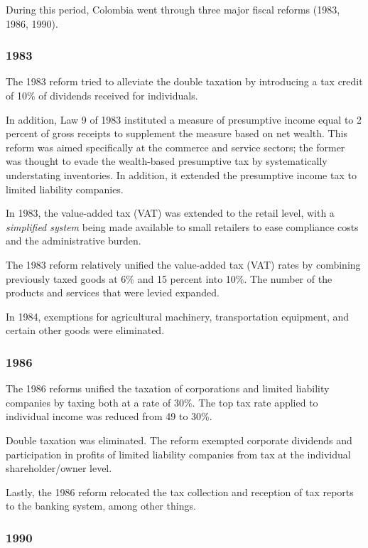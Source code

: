 \documentclass[
  12pt]{article}
\theoremstyle{definition}
\theoremstyle{remark}
\begin{document}
During this period, Colombia went through three major fiscal reforms
(1983, 1986, 1990).

\subsubsection{1983}\label{section}

The 1983 reform tried to alleviate the double taxation by introducing a
tax credit of 10\% of dividends received for individuals.

In addition, Law 9 of 1983 instituted a measure of presumptive income
equal to 2 percent of gross receipts to supplement the measure based on
net wealth. This reform was aimed specifically at the commerce and
service sectors; the former was thought to evade the wealth-based
presumptive tax by systematically understating inventories. In addition,
it extended the presumptive income tax to limited liability companies.

In 1983, the value-added tax (VAT) was extended to the retail level,
with a \emph{simplified system} being made available to small retailers
to ease compliance costs and the administrative burden.

The 1983 reform relatively unified the value-added tax (VAT) rates by
combining previously taxed goods at 6\% and 15 percent into 10\%. The
number of the products and services that were levied expanded.

In 1984, exemptions for agricultural machinery, transportation
equipment, and certain other goods were eliminated.

\subsubsection{1986}\label{section-1}

The 1986 reforms unified the taxation of corporations and limited
liability companies by taxing both at a rate of 30\%. The top tax rate
applied to individual income was reduced from 49 to 30\%.

Double taxation was eliminated. The reform exempted corporate dividends
and participation in profits of limited liability companies from tax at
the individual shareholder/owner level.

Lastly, the 1986 reform relocated the tax collection and reception of
tax reports to the banking system, among other things.

\subsubsection{1990}\label{section-2}
\end{document}
